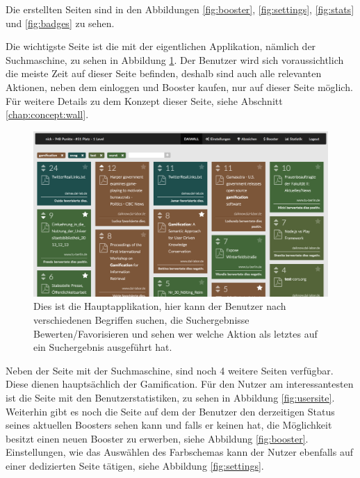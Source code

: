 \documentclass[12pt,twoside]{book}
\begin{document}
Die erstellten Seiten sind in den Abbildungen \ref{fig:booster}, \ref{fig:settings}, \ref{fig:stats} und \ref{fig:badges} zu sehen.

Die wichtigste Seite ist die mit der eigentlichen Applikation, nämlich der Suchmaschine, zu sehen in Abbildung \ref{fig:wall}. Der Benutzer wird sich voraussichtlich die meiste Zeit auf dieser Seite befinden, deshalb sind auch alle relevanten Aktionen, neben dem einloggen und Booster kaufen, nur auf dieser Seite möglich. Für weitere Details zu dem Konzept dieser Seite, siehe Abschnitt \ref{chap:concept:wall}.

\begin{figure}[htbp]
    \centering
    \includegraphics[width=1.0\textwidth]{images/infoboard_wall.png}
    \caption{Dies ist die Hauptapplikation, hier kann der Benutzer nach verschiedenen Begriffen suchen, die Suchergebnisse Bewerten/Favorisieren und sehen wer welche Aktion als letztes auf ein Suchergebnis ausgeführt hat.}\label{fig:wall}
\end{figure}

Neben der Seite mit der Suchmaschine, sind noch 4 weitere Seiten verfügbar. Diese dienen hauptsächlich der Gamification. Für den Nutzer am interessantesten ist die Seite mit den Benutzerstatistiken, zu sehen in Abbildung \ref{fig:usersite}.
Weiterhin gibt es noch die Seite auf dem der Benutzer den derzeitigen Status seines aktuellen Boosters sehen kann und falls er keinen hat, die Möglichkeit besitzt einen neuen Booster zu erwerben, siehe Abbildung \ref{fig:booster}. Einstellungen, wie das Auswählen des Farbschemas kann der Nutzer ebenfalls auf einer dedizierten Seite tätigen, siehe Abbildung \ref{fig:settings}.
\end{document}
